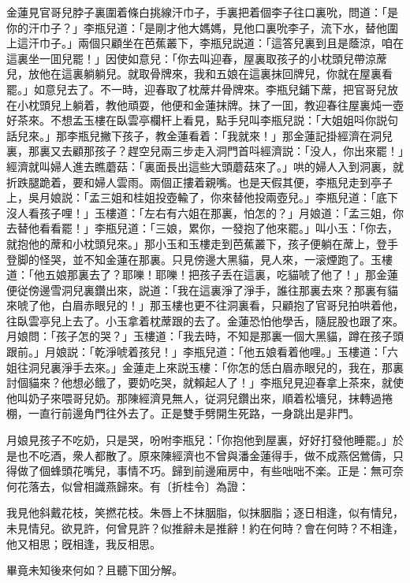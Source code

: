 金蓮見官哥兒脖子裏圍着條白挑線汗巾子，手裏把着個李子往口裏吮，問道：「是你的汗巾子？」李瓶兒道：「是剛才他大媽媽，見他口裏吮李子，流下水，替他圍上這汗巾子。」兩個只顧坐在芭蕉叢下，李瓶兒説道：「這答兒裏到且是蔭涼，咱在這裏坐一囬兒罷！」因使如意兒：「你去叫迎春，屋裏取孩子的小枕頭兒帶涼蓆兒，放他在這裏躺躺兒。就取骨牌來，我和五娘在這裏抹回牌兒，你就在屋裏看罷。」如意兒去了。不一時，迎春取了枕蓆幷骨牌來。李瓶兒鋪下蓆，把官哥兒放在小枕頭兒上躺着，教他頑耍，他便和金蓮抹牌。抹了一囬，教迎春往屋裏炖一壺好茶來。不想孟玉樓在臥雲亭欄杆上看見，點手兒叫李瓶兒説：「大姐姐呌你説句話兒來。」那李瓶兒撇下孩子，教金蓮看着：「我就來！」那金蓮記掛經濟在洞兒裏，那裏又去顧那孩子？趕空兒兩三步走入洞門首呌經濟説：「没人，你出來罷！」經濟就叫婦人進去瞧蘑菇：「裏面長出這些大頭蘑菇來了。」哄的婦人入到洞裏，就折跌腿跪着，要和婦人雲雨。兩個正摟着親嘴。也是天假其便，李瓶兒走到亭子上，吳月娘説：「孟三姐和桂姐投壺輸了，你來替他投兩壺兒。」李瓶兒道：「底下沒人看孩子哩！」玉樓道：「左右有六姐在那裏，怕怎的？」月娘道：「孟三姐，你去替他看看罷！」李瓶兒道：「三娘，累你，一發抱了他來罷。」叫小玉：「你去，就抱他的蓆和小枕頭兒來。」那小玉和玉樓走到芭蕉叢下，孩子便躺在蓆上，登手登脚的怪哭，並不知金蓮在那裏。只見傍邊大黑貓，見人來，一滚煙跑了。玉樓道：「他五娘那裏去了？耶嚛！耶嚛！把孩子丢在這裏，吃貓唬了他了！」那金蓮便従傍邊雪洞兒裏鑽出來，説道：「我在這裏淨了淨手，誰往那裏去來？那裏有貓來唬了他，白眉赤眼兒的！」那玉樓也更不往洞裏看，只顧抱了官哥兒拍哄着他，往臥雲亭兒上去了。小玉拿着枕蓆跟的去了。金蓮恐怕他學舌，隨屁股也跟了來。月娘問：「孩子怎的哭？」玉樓道：「我去時，不知是那裏一個大黑貓，蹲在孩子頭跟前。」月娘説：「乾淨唬着孩兒！」李瓶兒道：「他五娘看着他哩。」玉樓道：「六姐往洞兒裏淨手去來。」金蓮走上來説玉樓：「你怎的恁白眉赤眼兒的，我在，那裏討個貓來？他想必餓了，要奶吃哭，就賴起人了！」李瓶兒見迎春拿上茶來，就使他叫奶子來喂哥兒奶。那陳經濟見無人，従洞兒鑽出來，順着松墻兒，抹轉過捲棚，一直行前邊角門往外去了。正是雙手劈開生死路，一身跳出是非門。

月娘見孩子不吃奶，只是哭，吩咐李瓶兒：「你抱他到屋裏，好好打發他睡罷。」於是也不吃酒，衆人都散了。原來陳經濟也不曾與潘金蓮得手，做不成燕侶鶯儔，只得做了個蜂頭花嘴兒，事情不巧。歸到前邊廂房中，有些咄咄不楽。正是：無可奈何花落去，似曾相識燕歸來。有〔折桂令〕為證：

\begin{myquote}
我見他斜戴花枝，笑撚花枝。朱唇上不抹胭脂，似抹胭脂；逐日相逢，似有情兒，未見情兒。欲見許，何曾見許？似推辭未是推辭！約在何時？會在何時？不相逢，他又相思；旣相逢，我反相思。
\end{myquote}

畢竟未知後來何如？且聽下囬分解。

